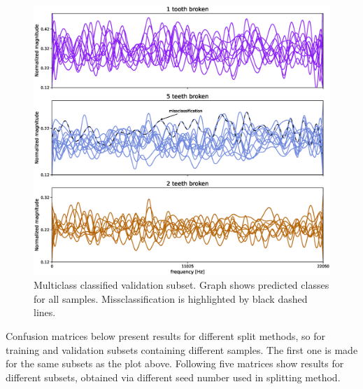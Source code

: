 \documentclass[energies,article,submit,pdftex,moreauthors]{Definitions/mdpi}
\begin{document}
\begin{figure}[H]
\centering
\includegraphics[width=\textwidth]{images/multiclass_classification}
\caption{Multiclass classified validation subset. Graph shows predicted classes for all samples. Missclassification is highlighted by black dashed lines.}
\label{fig:multiclass}
\end{figure}
\unskip
\vspace{5mm}

Confusion matrices below present results for different split methods, so for training and validation subsets containing different samples. The first one is made for the same subsets as the plot above. Following five matrices show results for different subsets, obtained via different seed number used in splitting method.
\end{document}
